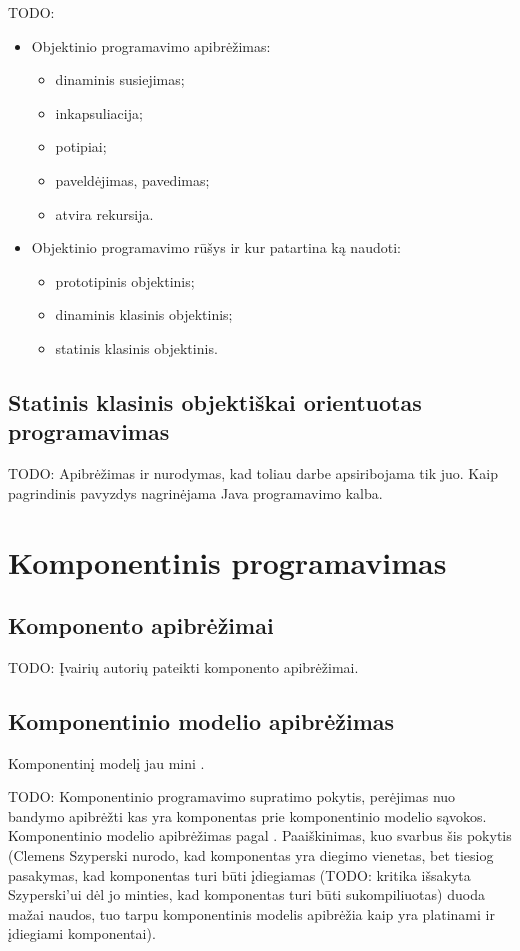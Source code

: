 TODO:
\begin{itemize}
  \item Objektinio programavimo apibrėžimas:
    \begin{itemize}
      \item dinaminis susiejimas;
      \item inkapsuliacija;
      \item potipiai;
      \item paveldėjimas, pavedimas;
      \item atvira rekursija.
    \end{itemize}
  \item Objektinio programavimo rūšys ir kur patartina ką naudoti:
    \begin{itemize}
      \item prototipinis objektinis;
      \item dinaminis klasinis objektinis;
      \item statinis klasinis objektinis.
    \end{itemize}
\end{itemize}

\section{Statinis klasinis objektiškai orientuotas programavimas}

TODO: Apibrėžimas ir nurodymas, kad toliau darbe apsiribojama tik juo.
Kaip pagrindinis pavyzdys nagrinėjama Java programavimo kalba.

\chapter{Komponentinis programavimas}

\section{Komponento apibrėžimai}

TODO: Įvairių autorių pateikti komponento apibrėžimai.

\section{Komponentinio modelio apibrėžimas}

Komponentinį modelį jau mini
\cite[4]{cs-beyond-object-oriented-programming}.

TODO: Komponentinio programavimo supratimo pokytis, perėjimas nuo
bandymo apibrėžti kas yra komponentas prie komponentinio modelio
sąvokos. Komponentinio modelio apibrėžimas pagal
\cite{classification-framework-for-scm}. Paaiškinimas, kuo svarbus šis
pokytis (Clemens Szyperski nurodo, kad komponentas yra diegimo
vienetas\cite{cs-beyond-object-oriented-programming}, bet tiesiog
pasakymas, kad komponentas turi būti įdiegiamas (TODO: kritika
išsakyta Szyperski'ui dėl jo minties, kad komponentas turi būti
sukompiliuotas) duoda mažai naudos, tuo tarpu komponentinis
modelis apibrėžia kaip yra platinami ir įdiegiami komponentai).


